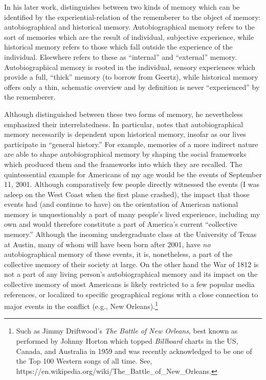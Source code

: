 In his later work, \halbwachs distinguishes between two
kinds of memory which can be identified by the experiential-relation of
the rememberer to the object of memory: autobiographical and historical
memory.\autocite[52]{halbwachs1980} Autobiographical memory refers to
the sort of memories which are the result of individual, subjective
experience, while historical memory refers to those which fall outside
the experience of the individual. Elsewhere \halbwachs
refers to these as ``internal'' and ``external'' memory.
Autobiographical memory is rooted in the individual, sensory experiences
which provide a full, ``thick'' memory (to borrow from Geertz), while
historical memory offers only a thin, schematic overview and by
definition is never ``experienced'' by the rememberer.

Although \halbwachs distinguished between these two
forms of memory, he nevertheless emphasized their interrelatedness. In
particular, \halbwachs notes that autobiographical
memory necessarily is dependent upon historical memory, insofar as our
lives participate in ``general history.''\autocite[52]{halbwachs1980}
For example, memories of a more indirect nature are able to shape
autobiographical memory by shaping the social frameworks which produced
them and the frameworks into which they are recalled. The quintessential
example for Americans of my age would be the events of September 11,
2001. Although comparatively few people directly witnessed the events (I
was asleep on the West Coast when the first plane crashed), the impact
that those events had (and continue to have) on the orientation of
American national memory is unquestionably a part of many people's lived
experience, including my own and would therefore constitute a part of
America's current ``collective memory.'' Although the incoming
undergraduate class at the University of Texas at Austin, many of whom
will have been born after 2001, have \emph{no} autobiographical memory
of these events, it is, nonetheless, a part of the collective memory of
their society at large. On the other hand the War of 1812 is not a part
of any living person's autobiographical memory and its impact on the
collective memory of most Americans is likely restricted to a few
popular media references, or localized to specific geographical regions
with a close connection to major events in the conflict (e.g., New
Orleans).\footnote{Such as Jimmy Driftwood's \emph{The Battle of New
  Orleans}, best known as performed by Johnny Horton which topped
  \emph{Billboard} charts in the US, Canada, and Australia in 1959 and
  was recently acknowledged to be one of the Top 100 Western songs of
  all time. See,
  https://en.wikipedia.org/wiki/The\_Battle\_of\_New\_Orleans.}

